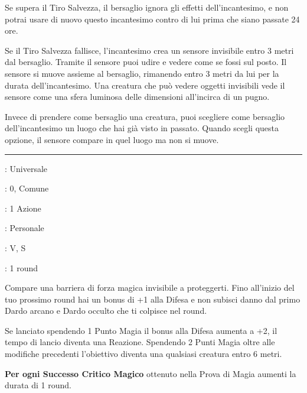 \begin{multicols}{2}
Se supera il Tiro Salvezza, il bersaglio ignora gli effetti dell'incantesimo, e non potrai usare di nuovo questo incantesimo contro di lui prima che siano passate 24 ore.

Se il Tiro Salvezza fallisce, l'incantesimo crea un sensore invisibile entro 3 metri dal bersaglio. Tramite il sensore puoi udire e vedere come se fossi sul posto. Il sensore si muove assieme al bersaglio, rimanendo entro 3 metri da lui per la durata dell'incantesimo. Una creatura che può vedere oggetti invisibili vede il sensore come una sfera luminosa delle dimensioni all'incirca di un pugno.

Invece di prendere come bersaglio una creatura, puoi scegliere come bersaglio dell'incantesimo un luogo che hai già visto in passato. Quando scegli questa opzione, il sensore compare in quel luogo ma non si muove.

\smallskip\noindent\rule{\linewidth}{2pt} \hypertarget{Scudo}{}\medskip{}
\noindent
\begin{description}[noitemsep, topsep=0pt, parsep=0pt, partopsep=0pt, leftmargin=0cm, labelwidth=2.8cm]
	\item[\textbf{Lista di Magia}]: Universale
	\item[\textbf{Livello}]: 0, Comune
	\item[\textbf{T. di Lancio}]: 1 Azione
	\item[\textbf{Gittata}]: Personale
	\item[\textbf{Componenti}]: V, S
	\item[\textbf{Durata}]: 1 round
\end{description}

Compare una barriera di forza magica invisibile a proteggerti. Fino all'inizio del tuo prossimo round hai un bonus di +1 alla Difesa e non subisci danno dal primo Dardo arcano e Dardo occulto che ti colpisce nel round.

Se lanciato spendendo 1 Punto Magia il bonus alla Difesa aumenta a +2, il tempo di lancio diventa una Reazione. Spendendo 2 Punti Magia oltre alle modifiche precedenti l'obiettivo diventa una qualsiasi creatura entro 6 metri.

\textbf{Per ogni Successo Critico Magico} ottenuto nella Prova di Magia aumenti la durata di 1 round.


\end{multicols}

